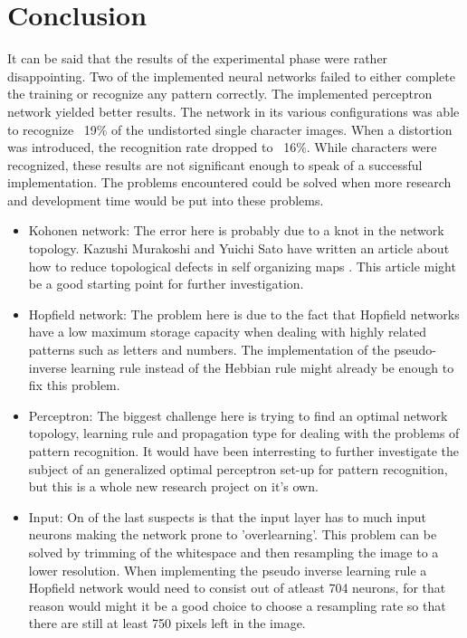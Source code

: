 \documentclass[pdftex,a4paper,12pt,twoside]{report}
\theoremstyle{plain} \newtheorem{theorem}{Theorem} \newtheorem{proposition}{Proposition} \newtheorem{lemma}{Lemma} \newtheorem*{corollary}{Corollary}
\theoremstyle{definition} \newtheorem{definition}{Definition} \newtheorem{conjecture}{Conjecture} \newtheorem*{example}{Example} \newtheorem{algorithm}{Algorithm}
\theoremstyle{remark} \newtheorem*{remark}{Remark} \newtheorem*{note}{Note} \newtheorem{case}{Case}
\begin{document}
\chapter{Conclusion}
\label{ch:conclusie}
It can be said that the results of the experimental phase were rather disappointing. Two of the implemented neural networks failed to either complete the training or recognize any pattern correctly. The implemented perceptron network yielded better results. The network in its various configurations was able to recognize ~19\% of the undistorted single character images.  When a distortion was introduced, the recognition rate dropped to ~16\%. While characters were recognized, these results are not significant enough to speak of a successful implementation. The problems encountered could be solved when more research and development time would be put into these problems.
\begin{itemize}
\item Kohonen network: The error here is probably due to a knot in the network topology. Kazushi Murakoshi and Yuichi Sato have written an article about how to reduce topological defects in self organizing maps \citep{Murakoshi2006}. This article might be a good starting point for further investigation.
\item Hopfield network: The problem here is due to the fact that Hopfield networks have a low maximum storage capacity when dealing with highly related patterns such as letters and numbers. The implementation of the pseudo-inverse learning rule instead of the Hebbian rule might already be enough to fix this problem.
\item Perceptron: The biggest challenge here is trying to find an optimal network topology, learning rule and propagation type for dealing with the problems of pattern recognition. It would have been interresting to further investigate the subject of an generalized optimal perceptron set-up for pattern recognition, but this is a whole new research project on it's own.
\item Input: On of the last suspects is that the input layer has to much input neurons making the network prone to 'overlearning'. This problem can be solved by trimming of the whitespace and then resampling the image to a lower resolution. When implementing the pseudo inverse learning rule a Hopfield network would need to consist out of atleast 704 neurons, for that reason would might it be a good choice to choose a resampling rate so that there are still at least 750 pixels left in the image.
\end{itemize}
\end{document}
